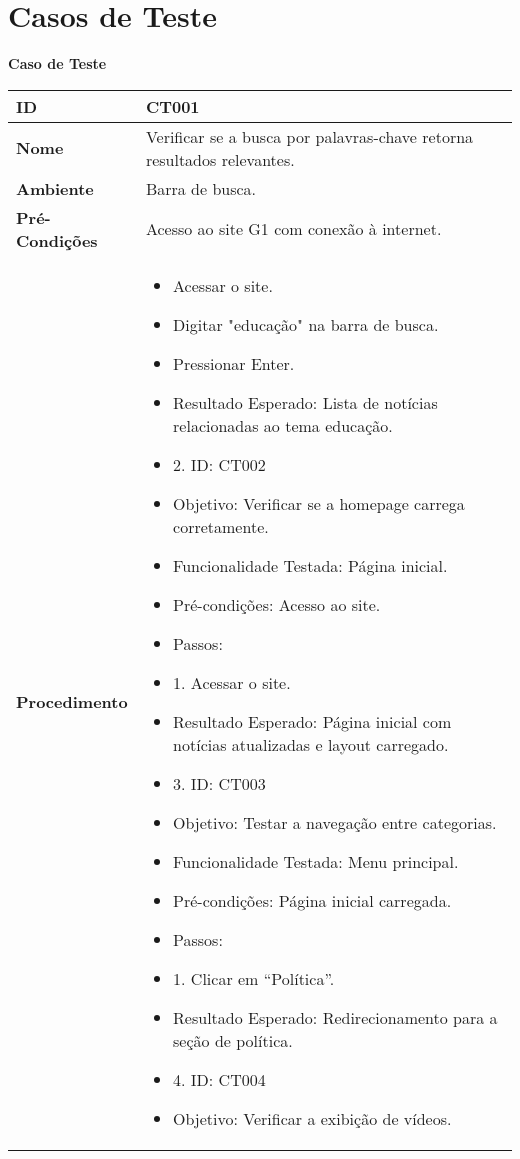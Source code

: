 \documentclass[12pt]{article}
\begin{document}
\section*{Casos de Teste}
\begin{center}
    \textbf{\Large Caso de Teste}
\end{center}

\vspace{0.5cm}

\renewcommand{\arraystretch}{1.5}
\begin{tabular}{|>{\bfseries}p{4cm}|p{10cm}|}
    \hline
    ID & CT001 \\
    \hline
    Nome & Verificar se a busca por palavras-chave retorna resultados relevantes. \\
    \hline
    Ambiente & Barra de busca. \\
    \hline
    Pré-Condições & Acesso ao site G1 com conexão à internet. \\
    \hline
    Procedimento & 
    \begin{itemize}
\item Acessar o site.
\item Digitar "educação" na barra de busca.
\item Pressionar Enter.
\item Resultado Esperado: Lista de notícias relacionadas ao tema educação.
\item 2. ID: CT002
\item Objetivo: Verificar se a homepage carrega corretamente.
\item Funcionalidade Testada: Página inicial.
\item Pré-condições: Acesso ao site.
\item Passos:
\item 1. Acessar o site.
\item Resultado Esperado: Página inicial com notícias atualizadas e layout carregado.
\item 3. ID: CT003
\item Objetivo: Testar a navegação entre categorias.
\item Funcionalidade Testada: Menu principal.
\item Pré-condições: Página inicial carregada.
\item Passos:
\item 1. Clicar em “Política”.
\item Resultado Esperado: Redirecionamento para a seção de política.
\item 4. ID: CT004
\item Objetivo: Verificar a exibição de vídeos.

\end{itemize}
\end{tabular}
\end{document}

